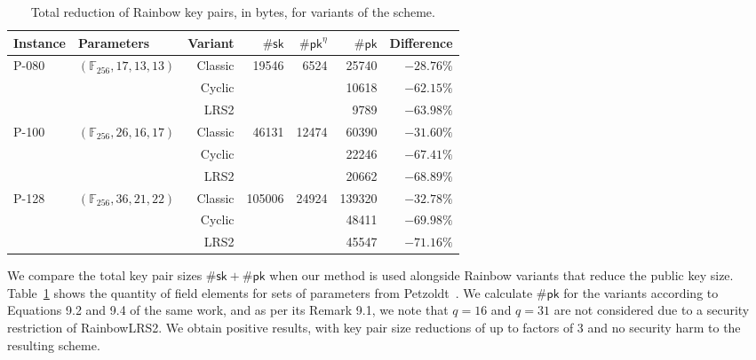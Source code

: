 \documentclass[draft, 12pt, a4paper, oneside]{memoir}
\theoremstyle{definition}
\begin{document}
\begin{table}[htbp]
  \renewcommand{\arraystretch}{1.2}
  \centering
  \caption{Total reduction of Rainbow key pairs, in bytes, for variants of the scheme.}\label{tab:2}
  \begin{tabular}{*{2}{l}*{5}{r}}
    \toprule
    Instance & Parameters & Variant & $\#\mathsf{sk}$ & $\#\mathsf{pk}^{\eta}$ & $\#\mathsf{pk}$ & Difference \\ \midrule
    \multirow{3}{*}{P-080}  & \multirow{3}{*}{$(\mathbb{F}_{256}, 17, 13, 13)$}  &  Classic &  \multirow{3}{*}{ 19546} &  \multirow{3}{*}{ 6524} &   25740 & $-28.76\%$ \\
                            &                                                    &   Cyclic &                          &                         &   10618 & $-62.15\%$ \\
                            &                                                    &     LRS2 &                          &                         &    9789 & $-63.98\%$ \\
    \multirow{3}{*}{P-100}  & \multirow{3}{*}{$(\mathbb{F}_{256}, 26, 16, 17)$}  &  Classic &  \multirow{3}{*}{ 46131} &  \multirow{3}{*}{12474} &   60390 & $-31.60\%$ \\
                            &                                                    &   Cyclic &                          &                         &   22246 & $-67.41\%$ \\
                            &                                                    &     LRS2 &                          &                         &   20662 & $-68.89\%$ \\
    \multirow{3}{*}{P-128}  & \multirow{3}{*}{$(\mathbb{F}_{256}, 36, 21, 22)$}  &  Classic &  \multirow{3}{*}{105006} &  \multirow{3}{*}{24924} &  139320 & $-32.78\%$ \\
                            &                                                    &   Cyclic &                          &                         &   48411 & $-69.98\%$ \\
                            &                                                    &     LRS2 &                          &                         &   45547 & $-71.16\%$ \\
    \bottomrule
  \end{tabular}
\end{table}

We compare the total key pair sizes $\#\mathsf{sk} + \#\mathsf{pk}$
when our method is used alongside Rainbow variants that reduce the public key
size. Table~\ref{tab:2} shows the quantity of field elements for sets of
parameters from Petzoldt~\cite[Table 9.8]{Petzoldt:201307}. We calculate
$\#\mathsf{pk}$ for the variants according to Equations 9.2 and 9.4 of the
same work, and as per its Remark 9.1, we note that $q = 16$ and $q = 31$ are not
considered due to a security restriction of RainbowLRS2. We obtain positive
results, with key pair size reductions of up to factors of 3 and no security
harm to the resulting scheme.
\end{document}
